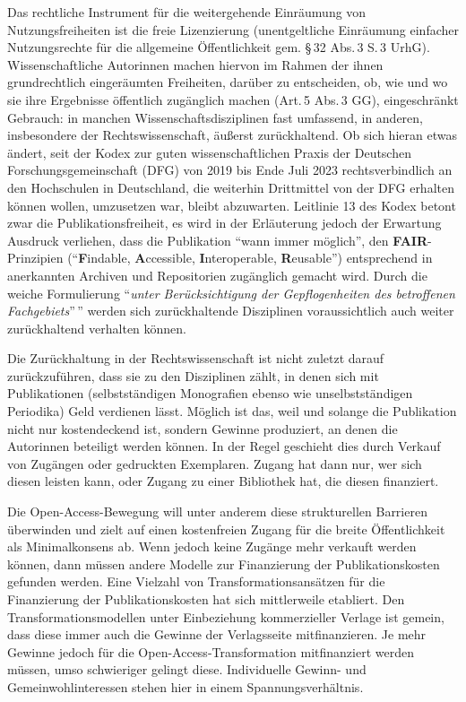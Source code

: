 \documentclass[a4paper,
fontsize=11pt,
oneside,
numbers=noperiodatend,
parskip=half-,
bibliography=totoc,
final
]{scrartcl}
\begin{document}
Das rechtliche Instrument für die weitergehende Einräumung von
Nutzungsfreiheiten ist die freie Lizenzierung (unentgeltliche Einräumung
einfacher Nutzungsrechte für die allgemeine Öffentlichkeit gem. §\,32
Abs.\,3 S.\,3 UrhG). Wissenschaftliche Autorinnen machen hiervon im
Rahmen der ihnen grundrechtlich eingeräumten Freiheiten, darüber zu
entscheiden, ob, wie und wo sie ihre Ergebnisse öffentlich zugänglich
machen (Art.\,5 Abs.\,3 GG), eingeschränkt Gebrauch: in manchen
Wissenschaftsdisziplinen fast umfassend, in anderen, insbesondere der
Rechtswissenschaft, äußerst zurückhaltend. Ob sich hieran etwas ändert,
seit der Kodex zur guten wissenschaftlichen Praxis der Deutschen
Forschungsgemeinschaft (DFG) von 2019 bis Ende Juli 2023
rechtsverbindlich an den Hochschulen in Deutschland, die weiterhin
Drittmittel von der DFG erhalten können wollen, umzusetzen war, bleibt
abzuwarten. Leitlinie 13 des Kodex betont zwar die Publikationsfreiheit,
es wird in der Erläuterung jedoch der Erwartung Ausdruck verliehen, dass
die Publikation \enquote{wann immer möglich}, den
\textbf{FAIR}-Prinzipien (\enquote{\textbf{F}indable,
\textbf{A}ccessible, \textbf{I}nteroperable, \textbf{R}eusable})
entsprechend in anerkannten Archiven und Repositorien zugänglich gemacht
wird. Durch die weiche Formulierung \enquote{\emph{unter
Berücksichtigung der Gepflogenheiten des betroffenen Fachgebiets}}\,''
werden sich zurückhaltende Disziplinen voraussichtlich auch weiter
zurückhaltend verhalten können.

Die Zurückhaltung in der Rechtswissenschaft ist nicht zuletzt darauf
zurückzuführen, dass sie zu den Disziplinen zählt, in denen sich mit
Publikationen (selbstständigen Monografien ebenso wie unselbstständigen
Periodika) Geld verdienen lässt. Möglich ist das, weil und solange die
Publikation nicht nur kostendeckend ist, sondern Gewinne produziert, an
denen die Autorinnen beteiligt werden können. In der Regel geschieht
dies durch Verkauf von Zugängen oder gedruckten Exemplaren. Zugang hat
dann nur, wer sich diesen leisten kann, oder Zugang zu einer Bibliothek
hat, die diesen finanziert.

Die Open-Access-Bewegung will unter anderem diese strukturellen
Barrieren überwinden und zielt auf einen kostenfreien Zugang für die
breite Öffentlichkeit als Minimalkonsens ab. Wenn jedoch keine Zugänge
mehr verkauft werden können, dann müssen andere Modelle zur Finanzierung
der Publikationskosten gefunden werden. Eine Vielzahl von
Transformationsansätzen für die Finanzierung der Publikationskosten hat
sich mittlerweile etabliert. Den Transformationsmodellen unter
Einbeziehung kommerzieller Verlage ist gemein, dass diese immer auch die
Gewinne der Verlagsseite mitfinanzieren. Je mehr Gewinne jedoch für die
Open-Access-Transformation mitfinanziert werden müssen, umso schwieriger
gelingt diese. Individuelle Gewinn- und Gemeinwohlinteressen stehen hier
in einem Spannungsverhältnis.
\end{document}
